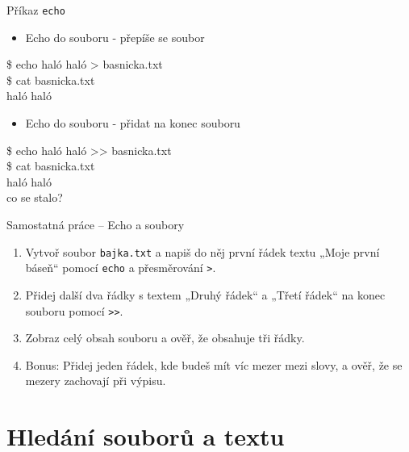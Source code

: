 \documentclass{beamer}
\begin{document}
\begin{frame}[fragile]{Příkaz \texttt{echo}}
	\begin{itemize}
		\item Echo do souboru - přepíše se soubor
	\end{itemize}
	\hspace{3em} \$	echo haló haló > basnicka.txt \\
	\hspace{3em} \$ cat basnicka.txt\\
	\hspace{3em}	haló haló\\

	\vspace{1em}
	\begin{itemize}
		\item Echo do souboru - přidat na konec souboru
	\end{itemize}
	\hspace{3em} \$	echo haló haló >{}> basnicka.txt \\
	\hspace{3em} \$ cat basnicka.txt\\
	\hspace{3em}	haló haló\\
	\hspace{3em}    co se stalo?
\end{frame}

\begin{frame}{Samostatná práce – Echo a soubory}
	\begin{enumerate}
		\item Vytvoř soubor \texttt{bajka.txt} a napiš do něj první řádek textu „Moje první báseň“ pomocí \texttt{echo} a přesměrování \texttt{>}.
		\item Přidej další dva řádky s textem „Druhý řádek“ a „Třetí řádek“ na konec souboru pomocí \texttt{>{}>}.
		\item Zobraz celý obsah souboru a ověř, že obsahuje tři řádky.
		\item Bonus: Přidej jeden řádek, kde budeš mít víc mezer mezi slovy, a ověř, že se mezery zachovají při výpisu.
	\end{enumerate}
\end{frame}

\section{Hledání souborů a textu}
\end{document}
